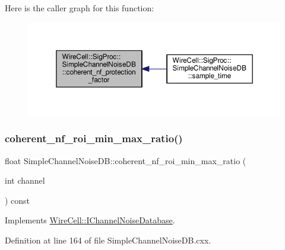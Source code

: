Here is the caller graph for this function\+:
\nopagebreak
\begin{figure}[H]
\begin{center}
\leavevmode
\includegraphics[width=350pt]{class_wire_cell_1_1_sig_proc_1_1_simple_channel_noise_d_b_aa17316b608537c3cf2c30ab600092bac_icgraph}
\end{center}
\end{figure}
\mbox{\label{class_wire_cell_1_1_sig_proc_1_1_simple_channel_noise_d_b_a31eba95e77c824eb351f3ed4e5e58eac}} 
\subsubsection{\texorpdfstring{coherent\+\_\+nf\+\_\+roi\+\_\+min\+\_\+max\+\_\+ratio()}{coherent\_nf\_roi\_min\_max\_ratio()}}
{\footnotesize\ttfamily float Simple\+Channel\+Noise\+D\+B\+::coherent\+\_\+nf\+\_\+roi\+\_\+min\+\_\+max\+\_\+ratio (\begin{DoxyParamCaption}\item[{int}]{channel }\end{DoxyParamCaption}) const\hspace{0.3cm}{\ttfamily [virtual]}}



Implements \hyperlink{class_wire_cell_1_1_i_channel_noise_database_a3fab0404aa8a10ad7ed2ac7afd2fe9a7}{Wire\+Cell\+::\+I\+Channel\+Noise\+Database}.



Definition at line 164 of file Simple\+Channel\+Noise\+D\+B.\+cxx.

